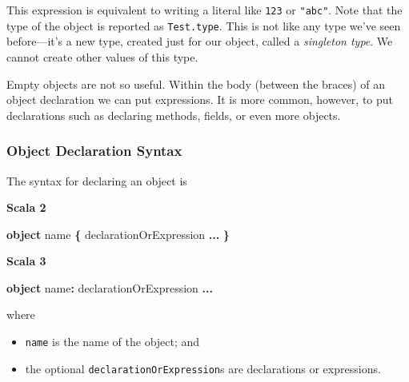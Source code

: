 \documentclass[11pt,a5paper,]{book}
\newenvironment{Shaded}{\begin{snugshade}}{\end{snugshade}}
\newcommand{\CommentTok}[1]{\textcolor[rgb]{0.56,0.35,0.01}{\textit{#1}}}
\newcommand{\KeywordTok}[1]{\textcolor[rgb]{0.13,0.29,0.53}{\textbf{#1}}}
\newcommand{\NormalTok}[1]{#1}
\newcommand{\OperatorTok}[1]{\textcolor[rgb]{0.81,0.36,0.00}{\textbf{#1}}}
\providecommand{\tightlist}{%
  \setlength{\itemsep}{0pt}\setlength{\parskip}{0pt}}
\begin{document}
\begin{Shaded}
\end{Shaded}

This expression is equivalent to writing a literal like \texttt{123} or
\texttt{"abc"}. Note that the type of the object is reported as
\texttt{Test.type}. This is not like any type we've seen before---it's a
new type, created just for our object, called a \emph{singleton type}.
We cannot create other values of this type.

Empty objects are not so useful. Within the body (between the braces) of
an object declaration we can put expressions. It is more common,
however, to put declarations such as declaring methods, fields, or even
more objects.

\hypertarget{object-declaration-syntax}{%
\subsubsection*{Object Declaration
Syntax}\label{object-declaration-syntax}}

The syntax for declaring an object is

\textbf{Scala 2}

\begin{Shaded}
\begin{Highlighting}[]
\KeywordTok{object}\NormalTok{ name }\OperatorTok{\{}
\NormalTok{  declarationOrExpression }\OperatorTok{...}
\OperatorTok{\}}
\end{Highlighting}
\end{Shaded}

\textbf{Scala 3}

\begin{Shaded}
\begin{Highlighting}[]
\KeywordTok{object}\NormalTok{ name}\OperatorTok{:}
\NormalTok{  declarationOrExpression }\OperatorTok{...}
\end{Highlighting}
\end{Shaded}

where

\begin{itemize}
\tightlist
\item
  \texttt{name} is the name of the object; and
\item
  the optional \texttt{declarationOrExpression}s are declarations or
  expressions.
\end{itemize}
\end{document}
